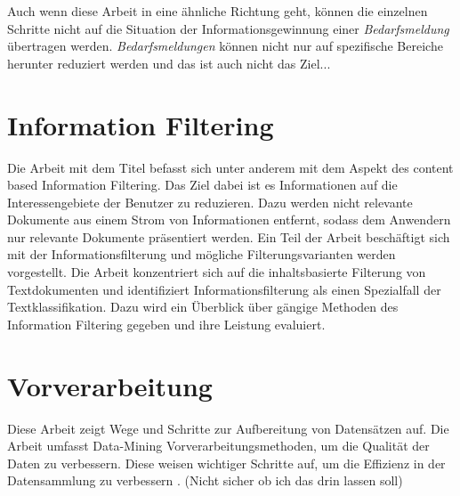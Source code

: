 Auch wenn diese Arbeit in eine ähnliche Richtung geht, können die einzelnen Schritte nicht auf die Situation der Informationsgewinnung einer \emph{Bedarfsmeldung} übertragen werden. \emph{Bedarfsmeldungen} können nicht nur auf spezifische Bereiche herunter reduziert werden und das ist auch nicht das Ziel... 



\section{Information Filtering}
Die Arbeit mit dem Titel \cite{lanquillon2001enhancing} befasst sich unter anderem mit dem Aspekt des content based Information Filtering. Das Ziel dabei ist es Informationen auf die Interessengebiete der Benutzer zu reduzieren. Dazu werden nicht relevante Dokumente aus einem Strom von Informationen entfernt, sodass dem Anwendern nur relevante Dokumente präsentiert werden. Ein Teil der Arbeit beschäftigt sich mit der Informationsfilterung und mögliche Filterungsvarianten werden vorgestellt. Die Arbeit konzentriert sich auf die inhaltsbasierte Filterung von Textdokumenten und identifiziert Informationsfilterung als einen Spezialfall der Textklassifikation. Dazu wird ein Überblick über gängige Methoden des Information Filtering gegeben und ihre Leistung evaluiert.

\section{Vorverarbeitung}
Diese Arbeit zeigt Wege und Schritte zur Aufbereitung von Datensätzen auf. Die Arbeit umfasst Data-Mining Vorverarbeitungsmethoden, um die Qualität der Daten zu verbessern. Diese weisen wichtiger Schritte auf, um die Effizienz in der Datensammlung zu verbessern \cite{alasadi2017review}. (Nicht sicher ob ich das drin lassen soll)\\

